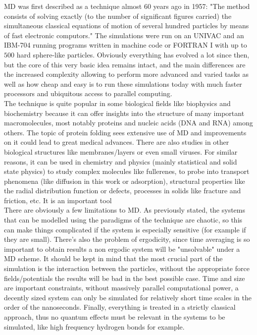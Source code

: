 \documentclass[11pt,a4paper,oneside]{article}
\begin{document}
		MD was first described as a technique almost 60 years ago in 1957: "The method consists of solving exactly (to the number of significant figures carried) the simultaneous classical equations of motion of several hundred particles by means of fast electronic computors."\cite{alder} The simulations were run on an UNIVAC and an IBM-704 running programs written in machine code or FORTRAN I with up to $500$ hard sphere-like particles. Obviously everything has evolved a lot since then, but the core of this very basic idea remains intact, and the main differences are the increased complexity allowing to perform more advanced and varied tasks as well as how cheap and easy is to run these simulations today with much faster processors and ubiquitous access to parallel computing.\\
		
		The technique is quite popular in some biological fields like biophysics and biochemistry because it can offer insights into the structure of many important macromolecules, most notably proteins and nucleic acids (DNA and RNA) among others. The topic of protein folding sees extensive use of MD and improvements on it could lead to great medical advances. There are also studies in other biological structures like membranes/layers or even small viruses\cite{virus}. For similar reasons, it can be used in chemistry and physics (mainly statistical and solid state physics) to study complex molecules like fullerenes, to probe into transport phenomena (like diffusion in this work or adsorption), structural properties like the radial distribution function or defects, processes in solids like fracture and friction, etc. It is an important tool\\
		
		There are obviously a few limitations to MD. As previously stated, the systems that can be modelled using the paradigms of the technique are chaotic, so this can make things complicated if the system is especially sensitive (for example if they are small). There's also the problem of ergodicity, since time averaging is so important to obtain results a non ergodic system will be "unsolvable" under a MD scheme. It should be kept in mind that the most crucial part of the simulation is the interaction between the particles, without the appropriate force fields/potentials the results will be bad in the best possible case. Time and size are important constraints, without massively parallel computational power, a decently sized system can only be simulated for relatively short time scales in the order of the nanoseconds. Finally, everything is treated in a strictly classical approach, thus no quantum effects must be relevant in the systems to be simulated, like high frequency hydrogen bonds for example.\\
		 	
\end{document}
